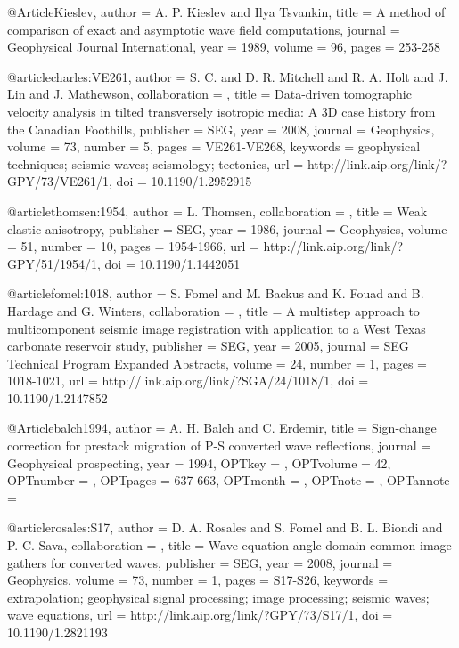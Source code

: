 @Article{Kieslev,
  author =	 {A. P. Kieslev and Ilya Tsvankin},
  title =	 {A method of comparison of exact and asymptotic wave
                  field computations},
  journal =	 {Geophysical Journal International},
  year =	 1989,
  volume =	 96,
  pages =	 {253-258}
}

@article{charles:VE261,
author = {S. C. and D. R. Mitchell and R. A. Holt and
                  J. Lin and J. Mathewson},
collaboration = {},
title = {Data-driven tomographic velocity analysis in tilted
                  transversely isotropic media: A 3{D}  case history from
                  the Canadian Foothills},
publisher = {SEG},
year = {2008},
journal = {Geophysics},
volume = {73},
number = {5},
pages = {VE261-VE268},
keywords = {geophysical techniques; seismic waves; seismology; tectonics},
url = {http://link.aip.org/link/?GPY/73/VE261/1},
doi = {10.1190/1.2952915}
}



@article{thomsen:1954,
author = {L. Thomsen},
collaboration = {},
title = {Weak elastic anisotropy},
publisher = {SEG},
year = {1986},
journal = {Geophysics},
volume = {51},
number = {10},
pages = {1954-1966},
url = {http://link.aip.org/link/?GPY/51/1954/1},
doi = {10.1190/1.1442051}
}


@article{fomel:1018,
author = {S. Fomel and M. Backus and K. Fouad and B. Hardage and G. Winters},
collaboration = {},
title = {A multistep approach to multicomponent seismic image
                  registration with application to a {W}est {T}exas
                  carbonate reservoir study},
publisher = {SEG},
year = {2005},
journal = {SEG Technical Program Expanded Abstracts},
volume = {24},
number = {1},
pages = {1018-1021},
url = {http://link.aip.org/link/?SGA/24/1018/1},
doi = {10.1190/1.2147852}
}




@Article{balch1994,
  author = 	 {A. H. Balch and C. Erdemir},
  title = 	 {Sign-change correction for prestack migration of P-S
                  converted wave reflections},
  journal = 	 {Geophysical prospecting},
  year = 	 {1994},
  OPTkey = 	 {},
  OPTvolume = 	 {42},
  OPTnumber = 	 {},
  OPTpages = 	 {637-663},
  OPTmonth = 	 {},
  OPTnote = 	 {},
  OPTannote = 	 {}
}


@article{rosales:S17,
author = {D. A. Rosales and S. Fomel and B. L. Biondi and P. C. Sava},
collaboration = {},
title = {Wave-equation angle-domain common-image gathers for converted waves},
publisher = {SEG},
year = {2008},
journal = {Geophysics},
volume = {73},
number = {1},
pages = {S17-S26},
keywords = {extrapolation; geophysical signal processing; image processing; seismic waves; wave equations},
url = {http://link.aip.org/link/?GPY/73/S17/1},
doi = {10.1190/1.2821193}
}




